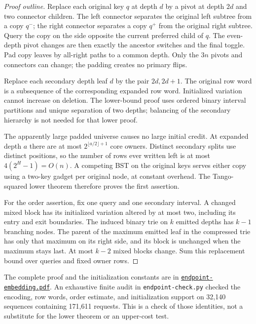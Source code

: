 \documentclass[11pt]{article}
\begin{document}
\begin{proof}[Proof outline]
Replace each original key $q$ at depth $d$ by a pivot at depth $2d$
and two connector children. The left connector separates the original
left subtree from a copy $q^-$; the right connector separates a copy
$q^+$ from the original right subtree. Query the copy on the side
opposite the current preferred child of $q$. The even-depth pivot
changes are then exactly the ancestor switches and the final toggle.
Pad copy leaves by all-right paths to a common depth. Only the $3n$
pivots and connectors can change; the padding creates no primary flips.

Replace each secondary depth leaf $d$ by the pair $2d,2d+1$.
The original row word is a subsequence of the corresponding expanded
row word. Initialized variation cannot increase on deletion.
The lower-bound proof uses ordered binary interval partitions and
unique separation of two depths; balancing of the secondary hierarchy
is not needed for that lower proof.

The apparently large padded universe causes no large initial credit.
At expanded depth $a$ there are at most
$2^{\lfloor a/2\rfloor+1}$ core owners. Distinct secondary splits use
distinct positions, so the number of rows ever written left is at most
$4(2^H-1)=O(n)$. A competing BST on the original keys serves either
copy using a two-key gadget per original node, at constant overhead.
The Tango-squared lower theorem therefore proves the first assertion.

For the order assertion, fix one query and one secondary interval.
A changed mixed block has its initialized variation altered by at
most two, including its entry and exit boundaries. The induced binary
trie on $k$ emitted depths has $k-1$ branching nodes. The parent of
the maximum emitted leaf in the compressed trie has only that maximum
on its right side, and its block is unchanged
when the maximum stays last. At most $k-2$ mixed blocks change.
Sum this replacement bound over queries and fixed owner rows.
\end{proof}

The complete proof and the initialization constants are in
\href{endpoint-embedding.pdf}{\texttt{endpoint-embedding.pdf}}.
An exhaustive finite audit in \texttt{endpoint-check.py} checked the
encoding, row words, order estimate, and initialization support on
32,140 sequences containing 171,611 requests. This is a check of those
identities, not a substitute for the lower theorem or an upper-cost test.
\end{document}
